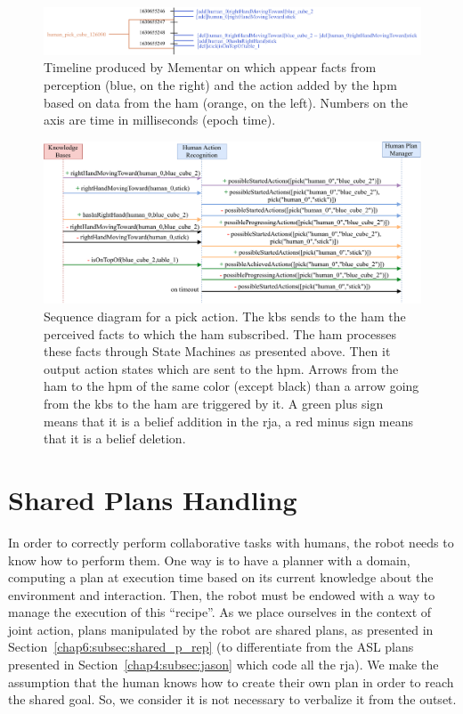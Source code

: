 \documentclass[a4paper,11pt,twoside]{StyleThese}
\begin{document}
\begin{landscape}
	\begin{figure}[!htb]
		\centering
		\includegraphics[width=0.9\linewidth]{figures/chapter2/action_reco_1.pdf}
		\caption{Timeline produced by Mementar on which appear facts from perception (blue, on the right) and the action added by the \acrlong{hpm} based on data from the \acrlong{ham} (orange, on the left). Numbers on the axis are time in milliseconds (epoch time).}
		\label{chap6:fig:action_reco_ex1_timeline}
	\end{figure}
	
	\begin{figure}[!htb]
		\centering
		\includegraphics[width=0.75\linewidth]{figures/chapter2/action_monitoring_ex1.pdf}
		\caption{Sequence diagram for a pick action. The \acrshort{kb}s sends to the \acrshort{ham} the perceived facts to which the \acrshort{ham} subscribed. The \acrshort{ham} processes these facts through State Machines as presented above. Then it output action states which are sent to the \acrfull{hpm}. Arrows from the \acrshort{ham} to the \acrshort{hpm} of the same color (except black) than a arrow going from the \acrshort{kb}s to the \acrshort{ham} are triggered by it. A green plus sign means that it is a belief addition in the \acrshort{rja}, a red minus sign means that it is a belief deletion.}
		\label{chap6:fig:action_reco_ex1}
	\end{figure}
\end{landscape}
\restoregeometry

\section{Shared Plans Handling}\label{chap6:sec:plan_handling}
In order to correctly perform collaborative tasks with humans, the robot needs to know how to perform them. One way is to have a planner with a domain, computing a plan at execution time based on its current knowledge about the environment and interaction. Then, the robot must be endowed with a way to manage the execution of this ``recipe''. As we place ourselves in the context of joint action, plans manipulated by the robot are shared plans, as presented in Section~\ref{chap6:subsec:shared_p_rep} (to differentiate from the ASL plans presented in Section~\ref{chap4:subsec:jason} which code all the \acrshort{rja}). We make the assumption that the human knows how to create their own plan in order to reach the shared goal. So, we consider it is not necessary to verbalize it from the outset.
\end{document}
